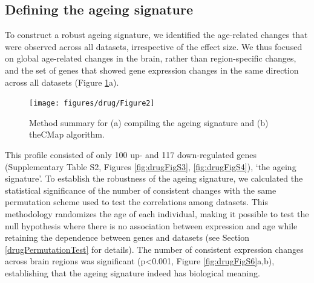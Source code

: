 \documentclass[12pt,twoside]{unicam}
\begin{document}
\hypertarget{ArrayAgeingSignatureResult}{%
\subsection{Defining the ageing signature}\label{ArrayAgeingSignatureResult}}

To construct a robust ageing signature, we identified the age-related changes that were observed across all datasets, irrespective of the effect size. We thus focused on global age-related changes in the brain, rather than region-specific changes, and the set of genes that showed gene expression changes in the same direction across all datasets (Figure \ref{fig:drugFig2}a).

\begin{figure}

{\centering \texttt{[image: figures/drug/Figure2]} 

}

\caption[Summary of the methods.]{Method summary for (a) compiling the ageing signature and (b) theCMap algorithm.}\label{fig:drugFig2}
\end{figure}

This profile consisted of only 100 up- and 117 down-regulated genes (Supplementary Table S2, Figures \ref{fig:drugFigS3}, \ref{fig:drugFigS4}), `the ageing signature'. To establish the robustness of the ageing signature, we calculated the statistical significance of the number of consistent changes with the same permutation scheme used to test the correlations among datasets. This methodology randomizes the age of each individual, making it possible to test the null hypothesis where there is no association between expression and age while retaining the dependence between genes and datasets (see Section \ref{drugPermutationTest} for details). The number of consistent expression changes across brain regions was significant (p\textless0.001, Figure \ref{fig:drugFigS6}a,b), establishing that the ageing signature indeed has biological meaning.
\end{document}
